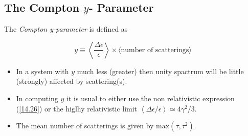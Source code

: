 \documentclass[a4paper,11pt,twoside]{article}
\begin{document}
    \subsection{ The Compton $y$- Parameter}

    The \textit{ Compton y-parameter } is defined as

    \begin{equation*}
    \label{14}
    y \equiv \left\langle \frac{\Delta \epsilon}{\epsilon} \right\rangle \times \langle \text{number of
        scatterings} \rangle
    \end{equation*}

    \begin{itemize}
        \item In a system with $y$ much less (greater) then unity spactrum will be little (strongly)
        affected by scattering(s).
        \item In computing $y$ it is usual to either use the non relativistic expression (\ref{14.26})
        or the higlhy relativistic limit $ \left \langle \Delta \epsilon / \epsilon \right\rangle \simeq 4
        \gamma^2 /3 $.
        \item The mean number of scatterings is given by $ \text{max}(\tau,\tau^2)$.
    \end{itemize}
\end{document}

